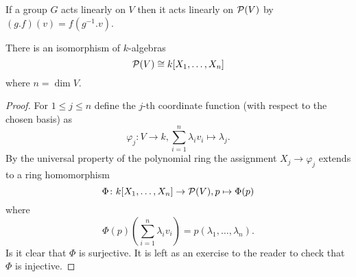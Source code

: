 \begin{rem}
  If a group $G$ acts linearly on $V$ then it acts linearly on $\mathcal{P}(V)$ by $(g.f)(v) = f\left(g^{-1}.v\right)$.
\end{rem}


\begin{lem}
  There is an isomorphism of $k$-algebras
  \[
          \mathcal{P}(V)
    \cong k[X_1, \dotsc, X_n]
  \]
  where $n = \dim V$.
\end{lem}
\begin{proof}
  For $1 \leq j \leq n$ define the $j$-th coordinate function (with respect to the chosen basis) as
  \[
            \varphi_j
    \colon  V \to k,
            \sum_{i=1}^n \lambda_i v_i
    \mapsto \lambda_j.
  \]
  By the universal property of the polynomial ring the assignment $X_j \to \varphi_j$ extends to a ring homomorphism
  \[
            \Phi
    \colon  k[X_1, \dotsc, X_n] \to \mathcal{P}(V),
            p
    \mapsto \Phi(p)
  \]
  where
  \[
      \Phi(p)\left( \sum_{i=1}^n \lambda_i v_i \right)
    = p(\lambda_1, \dotsc, \lambda_n).
  \]
  Is it clear that $\Phi$ is surjective.
  It is left as an exercise to the reader to check that $\Phi$ is injective.
\end{proof}


